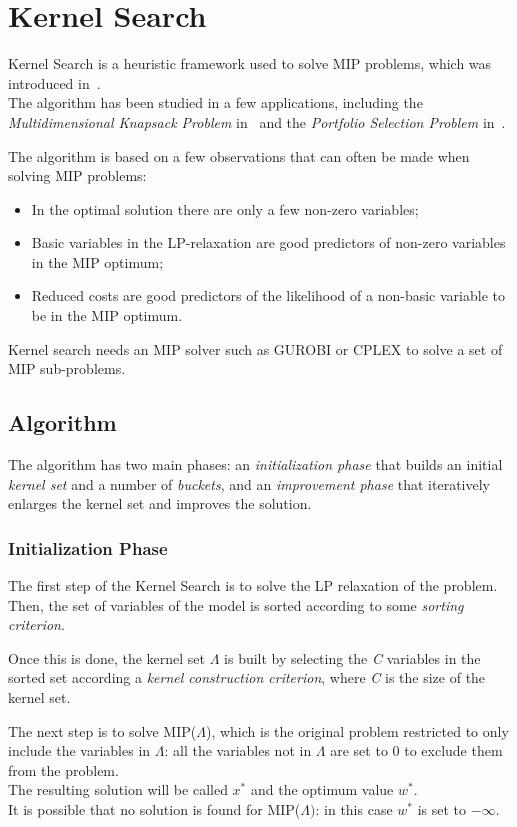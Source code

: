 \chapter{Kernel Search}\label{ch:kernel-search}
Kernel Search is a heuristic framework used to solve MIP problems, which was introduced in~\cite{kernel:2007}.\\
The algorithm has been studied in a few applications, including the \textit{Multidimensional Knapsack Problem}
in~\cite{kernel:2010} and the \textit{Portfolio Selection Problem} in~\cite{kernel:2012}.

The algorithm is based on a few observations that can often be made when solving MIP problems:
\begin{itemize}
    \item In the optimal solution there are only a few non-zero variables;
    \item Basic variables in the LP-relaxation are good predictors of non-zero variables in the MIP optimum;
    \item Reduced costs are good predictors of the likelihood of a non-basic variable to be in the MIP optimum.
\end{itemize}

Kernel search needs an MIP solver such as GUROBI or CPLEX to solve a set of MIP sub-problems.


\section{Algorithm}
The algorithm has two main phases: an \textit{initialization phase}
that builds an initial \textit{kernel set} and a number of \textit{buckets},
and an \textit{improvement phase} that iteratively enlarges the kernel set and improves the solution.

\subsection{Initialization Phase}
The first step of the Kernel Search is to solve the LP relaxation of the problem.\\
Then, the set of variables of the model is sorted according to some \textit{sorting criterion}.

Once this is done, the kernel set \(\Lambda\) is built by selecting the \textit{C}
variables in the sorted set according a \textit{kernel construction criterion},
where \textit{C} is the size of the kernel set.

The next step is to solve MIP(\(\Lambda\)),
which is the original problem restricted to only include the variables in \(\Lambda\):
all the variables not in \(\Lambda\) are set to 0 to exclude them from the problem.\\
The resulting solution will be called \(x^{*}\) and the optimum value \(w^{*}\).\\
It is possible that no solution is found for MIP(\(\Lambda)\): in this case \(w^{*}\) is set to \(-\infty\).

